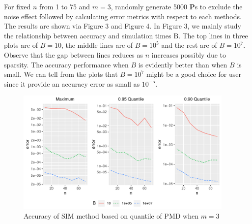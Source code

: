 \documentclass[12pt]{article}
\newcommand{\Pmat}{\mathbf{P}}
\newcommand{\PMD}{\textrm{PMD}}
\newcommand{\SIM}{{\textrm{SIM}}}
\begin{document}
For fixed $n$ from 1 to 75 and $m=3$, randomly generate 5000 $\Pmat$s to exclude the noise effect followed by calculating error metrics with respect to each methods. The results are shown via Figure 3 and Figure 4. In Figure 3, we mainly study the relationship between accuracy and simulation times $\mbox{B}$. The top lines in three plots are of $B=10$,  the middle lines are of $B=10^5$ and the rest are of $B=10^7$. Observe that the gap between lines reduces as $n$ increases possibly due to sparsity. The accuracy performance when $B$ is evidently better than when $B$ is small. We can tell from the plots that $B=10^7$ might be a good choice for user since it provide an accuracy error as small as $10^{-5}$.
\begin{figure}%
	\centering
	\includegraphics[width=0.95\textwidth]{figures/simulation.pdf}
	\caption{Accuracy of $\SIM$ method based on quantile of $\PMD$ when $m=3$}
	\label{fig: dft accuracy}
\end{figure}
\end{document}
